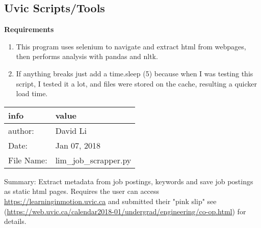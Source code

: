 \subsection{Uvic Scripts/Tools}\label{uvic-scriptstools}

\textbf{Requirements}

\begin{enumerate}
\def\labelenumi{\arabic{enumi}.}

\item
  This program uses selenium to navigate and extract html from webpages,
  then performs analysis with pandas and nltk.
\item
  If anything breaks just add a time.sleep (5) because when I was
  testing this script, I tested it a lot, and files were stored on the
  cache, resulting a quicker load time.
\end{enumerate}

\begin{longtable}[]{@{}ll@{}}
\toprule
\begin{minipage}[b]{0.20\columnwidth}\raggedright
info\strut
\end{minipage} & \begin{minipage}[b]{0.34\columnwidth}\raggedright
value\strut
\end{minipage}\tabularnewline
\midrule
\endhead
\begin{minipage}[t]{0.20\columnwidth}\raggedright
author:\strut
\end{minipage} & \begin{minipage}[t]{0.34\columnwidth}\raggedright
David Li\strut
\end{minipage}\tabularnewline
\begin{minipage}[t]{0.20\columnwidth}\raggedright
Date:\strut
\end{minipage} & \begin{minipage}[t]{0.34\columnwidth}\raggedright
Jan 07, 2018\strut
\end{minipage}\tabularnewline
\begin{minipage}[t]{0.20\columnwidth}\raggedright
File Name:\strut
\end{minipage} & \begin{minipage}[t]{0.34\columnwidth}\raggedright
lim\_job\_scrapper.py\strut
\end{minipage}\tabularnewline
\bottomrule
\end{longtable}

Summary: Extract metadata from job postings, keywords and save job
postings as static html pages. Requires the user can access
\url{https://learninginmotion.uvic.ca} and submitted their "pink slip"
see
(\url{https://web.uvic.ca/calendar2018-01/undergrad/engineering/co-op.html})
for details.

